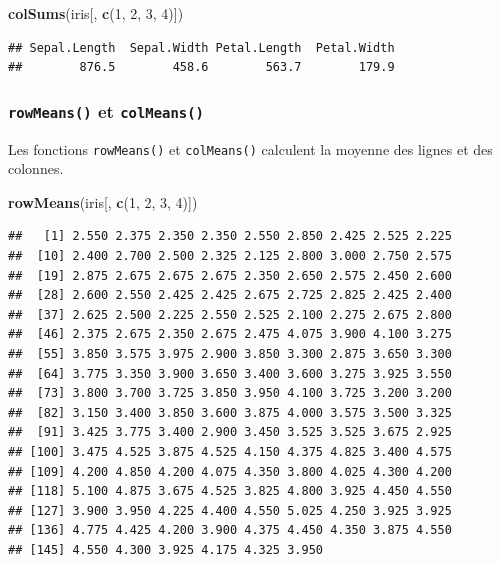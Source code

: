 \documentclass[twoside,symmetric]{book}
\newenvironment{Shaded}{}{}
\newcommand{\DecValTok}[1]{#1}
\newcommand{\KeywordTok}[1]{\textbf{#1}}
\newcommand{\NormalTok}[1]{#1}
\begin{document}
\begin{Shaded}
\begin{Highlighting}[]
\KeywordTok{colSums}\NormalTok{(iris[, }\KeywordTok{c}\NormalTok{(}\DecValTok{1}\NormalTok{, }\DecValTok{2}\NormalTok{, }\DecValTok{3}\NormalTok{, }\DecValTok{4}\NormalTok{)])}
\end{Highlighting}
\end{Shaded}

\begin{verbatim}
## Sepal.Length  Sepal.Width Petal.Length  Petal.Width 
##        876.5        458.6        563.7        179.9
\end{verbatim}

\hypertarget{l015rowmeans}{%
\subsubsection{\texorpdfstring{\texttt{rowMeans()} et \texttt{colMeans()}}{rowMeans() et colMeans()}}\label{l015rowmeans}}

Les fonctions \texttt{rowMeans()} et \texttt{colMeans()} calculent la moyenne des lignes et des colonnes.

\begin{Shaded}
\begin{Highlighting}[]
\KeywordTok{rowMeans}\NormalTok{(iris[, }\KeywordTok{c}\NormalTok{(}\DecValTok{1}\NormalTok{, }\DecValTok{2}\NormalTok{, }\DecValTok{3}\NormalTok{, }\DecValTok{4}\NormalTok{)])}
\end{Highlighting}
\end{Shaded}

\begin{verbatim}
##   [1] 2.550 2.375 2.350 2.350 2.550 2.850 2.425 2.525 2.225
##  [10] 2.400 2.700 2.500 2.325 2.125 2.800 3.000 2.750 2.575
##  [19] 2.875 2.675 2.675 2.675 2.350 2.650 2.575 2.450 2.600
##  [28] 2.600 2.550 2.425 2.425 2.675 2.725 2.825 2.425 2.400
##  [37] 2.625 2.500 2.225 2.550 2.525 2.100 2.275 2.675 2.800
##  [46] 2.375 2.675 2.350 2.675 2.475 4.075 3.900 4.100 3.275
##  [55] 3.850 3.575 3.975 2.900 3.850 3.300 2.875 3.650 3.300
##  [64] 3.775 3.350 3.900 3.650 3.400 3.600 3.275 3.925 3.550
##  [73] 3.800 3.700 3.725 3.850 3.950 4.100 3.725 3.200 3.200
##  [82] 3.150 3.400 3.850 3.600 3.875 4.000 3.575 3.500 3.325
##  [91] 3.425 3.775 3.400 2.900 3.450 3.525 3.525 3.675 2.925
## [100] 3.475 4.525 3.875 4.525 4.150 4.375 4.825 3.400 4.575
## [109] 4.200 4.850 4.200 4.075 4.350 3.800 4.025 4.300 4.200
## [118] 5.100 4.875 3.675 4.525 3.825 4.800 3.925 4.450 4.550
## [127] 3.900 3.950 4.225 4.400 4.550 5.025 4.250 3.925 3.925
## [136] 4.775 4.425 4.200 3.900 4.375 4.450 4.350 3.875 4.550
## [145] 4.550 4.300 3.925 4.175 4.325 3.950
\end{verbatim}
\end{document}
